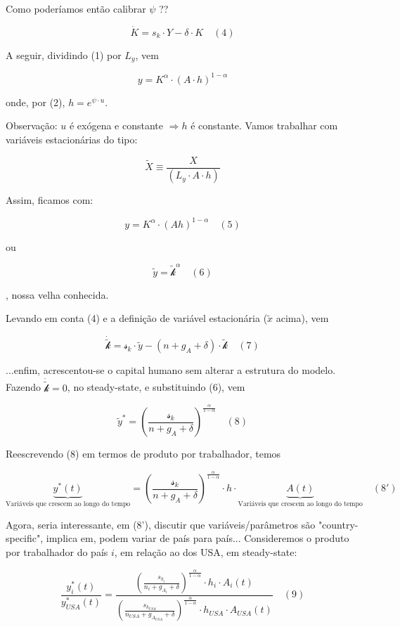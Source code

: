 \documentclass[a4paper,12pt]{article}[abntex2]
\begin{document}
Como poderíamos então calibrar \(\psi\) ??

\[
\dot{K} = s_k \cdot Y - \delta \cdot K \quad (4)
\]

A seguir, dividindo (1) por \(L_y\), vem

\[
y = K^{\alpha} \cdot (A \cdot h)^{1-\alpha}
\]

onde, por (2), \( h = e^{\psi \cdot u} \).

Observação: \( u \) é exógena e constante \(\Rightarrow h\) é constante. Vamos trabalhar com variáveis estacionárias do tipo:

\[
\tilde{X} \equiv \frac{X}{(L_y \cdot A \cdot h)}
\]

Assim, ficamos com:

\[
y = K^{\alpha} \cdot (A h)^{1-\alpha} \quad (5)
\]

ou

\[
\tilde{y} = \tilde{\mathcal{k}}^{\alpha} \quad (6)
\]

, nossa velha conhecida.

Levando em conta (4) e a definição de variável estacionária (\(\tilde{x}\) acima), vem

\[
\dot{\tilde{\mathcal{k}}} = \mathcal{s}_k \cdot \tilde{y} - (n + g_A + \delta) \cdot \tilde{\mathcal{k}} \quad (7)
\]

...enfim, acrescentou-se o capital humano sem alterar a estrutura do modelo. Fazendo \(\dot{\tilde{\mathcal{k}}} = 0\), no steady-state, e substituindo (6), vem

\[
\tilde{y}^* = \left(\frac{\mathcal{s}_k}{n+g_A+\delta}\right)^{\frac{\alpha}{1-\alpha}} \quad (8)
\]

Reescrevendo (8) em termos de produto por trabalhador, temos

\[
\underbrace{y^*(t)}_\text{Variáveis que crescem ao longo do tempo} = \left(\frac{\mathcal{s}_k}{n+g_A+\delta}\right)^{\frac{\alpha}{1-\alpha}} \cdot h \cdot \underbrace{A(t)}_\text{Variáveis que crescem ao longo do tempo} \quad (8')
\]



Agora, seria interessante, em (8'), discutir que variáveis/parâmetros são "country-specific", implica em, podem variar de país para país... Consideremos o produto por trabalhador do país \( i \), em relação ao dos USA, em steady-state:

\[
\frac{y_i^*(t)}{y_{USA}^*(t)} =
\frac{\left(\frac{s_{k_i}}{n_i + g_{A_i} + \delta} \right)^{\frac{\alpha}{1-\alpha}} \cdot h_i \cdot A_i(t)}
{\left(\frac{s_{k_{USA}}}{n_{USA} + g_{A_{USA}} + \delta} \right)^{\frac{\alpha}{1-\alpha}} \cdot h_{USA} \cdot A_{USA}(t)}
\quad (9)
\]
\end{document}
